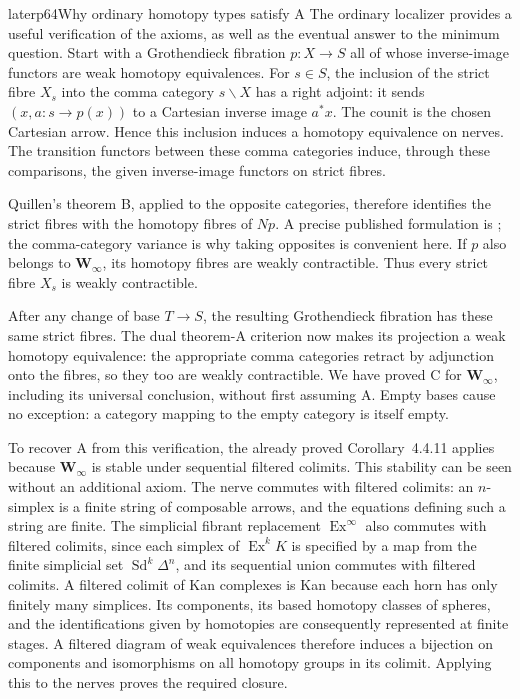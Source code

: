 \begin{dcomment}{later}{p64}{Why ordinary homotopy types satisfy A}
The ordinary localizer provides a useful verification of the axioms, as well as the eventual answer to the minimum question. Start with a Grothendieck fibration $p:X\to S$ all of whose inverse-image functors are weak homotopy equivalences. For $s\in S$, the inclusion of the strict fibre $X_s$ into the comma category $s\backslash X$ has a right adjoint: it sends $(x,a:s\to p(x))$ to a Cartesian inverse image $a^*x$. The counit is the chosen Cartesian arrow. Hence this inclusion induces a homotopy equivalence on nerves. The transition functors between these comma categories induce, through these comparisons, the given inverse-image functors on strict fibres.

Quillen's theorem B, applied to the opposite categories, therefore identifies the strict fibres with the homotopy fibres of $Np$. A precise published formulation is \citet[paragraph~2.3.1 and Theorem~2.3.2, p.~136]{Cisinski2004Minimal}; the comma-category variance is why taking opposites is convenient here. If $p$ also belongs to $\mathbf W_\infty$, its homotopy fibres are weakly contractible. Thus every strict fibre $X_s$ is weakly contractible.

After any change of base $T\to S$, the resulting Grothendieck fibration has these same strict fibres. The dual theorem-A criterion now makes its projection a weak homotopy equivalence: the appropriate comma categories retract by adjunction onto the fibres, so they too are weakly contractible. We have proved C for $\mathbf W_\infty$, including its universal conclusion, without first assuming A. Empty bases cause no exception: a category mapping to the empty category is itself empty.

To recover A from this verification, the already proved Corollary~4.4.11 applies because $\mathbf W_\infty$ is stable under sequential filtered colimits. This stability can be seen without an additional axiom. The nerve commutes with filtered colimits: an $n$-simplex is a finite string of composable arrows, and the equations defining such a string are finite. The simplicial fibrant replacement $\operatorname{Ex}^{\infty}$ also commutes with filtered colimits, since each simplex of $\operatorname{Ex}^kK$ is specified by a map from the finite simplicial set $\operatorname{Sd}^k\Delta^n$, and its sequential union commutes with filtered colimits. A filtered colimit of Kan complexes is Kan because each horn has only finitely many simplices. Its components, its based homotopy classes of spheres, and the identifications given by homotopies are consequently represented at finite stages. A filtered diagram of weak equivalences therefore induces a bijection on components and isomorphisms on all homotopy groups in its colimit. Applying this to the nerves proves the required closure.


\end{dcomment}
